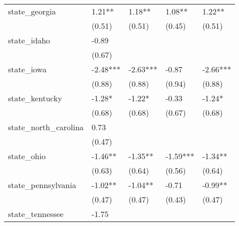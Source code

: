 {\begin{table}
\begin{center}
\begin{tabular}{lllll}
    state\_georgia                            & 1.21**              & 1.18**               & 1.08**                & 1.22**                  \\
                                              & (0.51)              & (0.51)               & (0.45)                & (0.51)                  \\
    state\_idaho                              & -0.89               &                      &                       &                         \\
                                              & (0.67)              &                      &                       &                         \\
    state\_iowa                               & -2.48***            & -2.63***             & -0.87                 & -2.66***                \\
                                              & (0.88)              & (0.88)               & (0.94)                & (0.88)                  \\
    state\_kentucky                           & -1.28*              & -1.22*               & -0.33                 & -1.24*                  \\
                                              & (0.68)              & (0.68)               & (0.67)                & (0.68)                  \\
    state\_north\_carolina                    & 0.73                &                      &                       &                         \\
                                              & (0.47)              &                      &                       &                         \\
    state\_ohio                               & -1.46**             & -1.35**              & -1.59***              & -1.34**                 \\
                                              & (0.63)              & (0.64)               & (0.56)                & (0.64)                  \\
    state\_pennsylvania                       & -1.02**             & -1.04**              & -0.71                 & -0.99**                 \\
                                              & (0.47)              & (0.47)               & (0.43)                & (0.47)                  \\
    state\_tennessee                          & -1.75               &                      &                       &                         \\

\end{tabular}
\end{center}
\end{table}}
